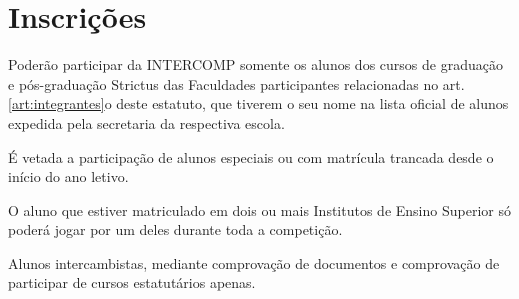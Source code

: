 
{\let\clearpage\relax \chapter{Inscrições}}

\begin{article}
	Poderão participar da INTERCOMP somente os alunos dos cursos de graduação e pós-graduação Strictus das Faculdades participantes relacionadas no art. \ref{art:integrantes}o deste estatuto, que tiverem o seu nome na lista oficial de alunos expedida pela secretaria da respectiva escola.

	\begin{xparagraph}
		É vetada a participação de alunos especiais ou com matrícula trancada desde o início do ano letivo.
	\end{xparagraph}

	\begin{xparagraph}
		O aluno que estiver matriculado em dois ou mais Institutos de Ensino Superior só poderá jogar por um deles durante toda a competição.
	\end{xparagraph}

	\begin{xparagraph}
		Alunos intercambistas, mediante comprovação de documentos e comprovação de participar de cursos estatutários apenas.
	\end{xparagraph}
\end{article}

